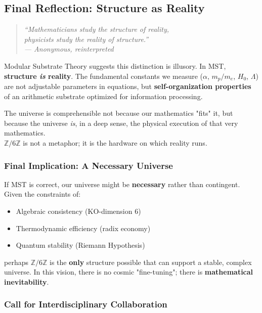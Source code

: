 \documentclass[11pt, a4paper]{article}
\theoremstyle{plain}
\theoremstyle{definition}
\newcommand{\Zmod}{\mathbb{Z}/6\mathbb{Z}}
\begin{document}
\subsection{Final Reflection: Structure as Reality}

\begin{quotation}
\centering
\itshape
``Mathematicians study the structure of reality, \\
physicists study the reality of structure.'' \\
--- Anonymous, reinterpreted
\end{quotation}

Modular Substrate Theory suggests this distinction is illusory. In MST, \textbf{structure \textit{is} reality}. The fundamental constants we measure ($\alpha$, $m_p/m_e$, $H_0$, $\Lambda$) are not adjustable parameters in equations, but \textbf{self-organization properties} of an arithmetic substrate optimized for information processing.

The universe is comprehensible not because our mathematics "fits" it, but because the universe \textit{is}, in a deep sense, the physical execution of that very mathematics.\\
$\Zmod$ is not a metaphor; it is the hardware on which reality runs.

\subsubsection{Final Implication: A Necessary Universe}

If MST is correct, our universe might be \textbf{necessary} rather than contingent. Given the constraints of:
\begin{itemize}
    \item Algebraic consistency (KO-dimension 6)
    \item Thermodynamic efficiency (radix economy)
    \item Quantum stability (Riemann Hypothesis)
\end{itemize}

perhaps $\Zmod$ is the \textbf{only} structure possible that can support a stable, complex universe. In this vision, there is no cosmic "fine-tuning"; there is \textbf{mathematical inevitability}.

\subsubsection{Call for Interdisciplinary Collaboration}
\end{document}
